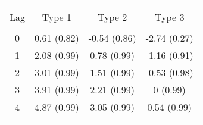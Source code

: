 
\begin{table}[!htbp] \centering 
  \caption{} 
  \label{tb:adf_test} 
\begin{tabular}{@{\extracolsep{5pt}} cccc} 
\\[-1.8ex]\hline 
\hline \\[-1.8ex] 
Lag & Type 1 & Type 2 & Type 3 \\ 
\hline \\[-1.8ex] 
0 & 0.61
(0.82) & -0.54
(0.86) & -2.74
(0.27) \\ 
1 & 2.08
(0.99) & 0.78
(0.99) & -1.16
(0.91) \\ 
2 & 3.01
(0.99) & 1.51
(0.99) & -0.53
(0.98) \\ 
3 & 3.91
(0.99) & 2.21
(0.99) & 0
(0.99) \\ 
4 & 4.87
(0.99) & 3.05
(0.99) & 0.54
(0.99) \\ 
\hline \\[-1.8ex] 
\end{tabular} 
\end{table} 
